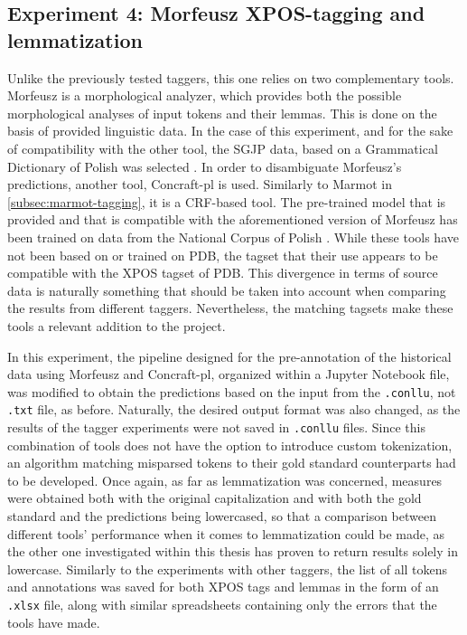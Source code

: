 \subsection{Experiment 4: Morfeusz XPOS-tagging and lemmatization}
\label{subsec:morfeusz-tagging}

Unlike the previously tested taggers, this one relies on two complementary tools. Morfeusz is a morphological analyzer, which provides both the possible morphological analyses of input tokens and their lemmas. This is done on the basis of provided linguistic data. In the case of this experiment, and for the sake of compatibility with the other tool, the SGJP data, based on a Grammatical Dictionary of Polish was selected \citep{sal:etal:15, kie:wol:17:morf}. In order to disambiguate Morfeusz's predictions, another tool, Concraft-pl is used. Similarly to Marmot in \autoref{subsec:marmot-tagging}, it is a CRF-based tool. The pre-trained model that is provided and that is compatible with the aforementioned version of Morfeusz has been trained on data from the National Corpus of Polish \citep{nkjp, waszczuk-2012-harnessing, waszczuk2018morphosyntactic}. While these tools have not been based on or trained on PDB, the tagset that their use appears to be compatible with the XPOS tagset of PDB. This divergence in terms of source data is naturally something that should be taken into account when comparing the results from different taggers. Nevertheless, the matching tagsets make these tools a relevant addition to the project. 

In this experiment, the pipeline designed for the pre-annotation of the historical data using Morfeusz and Concraft-pl, organized within a Jupyter Notebook file, was modified to obtain the predictions based on the input from the \texttt{.conllu}, not \texttt{.txt} file, as before. Naturally, the desired output format was also changed, as the results of the tagger experiments were not saved in \texttt{.conllu} files. Since this combination of tools does not have the option to introduce custom tokenization, an algorithm matching misparsed tokens to their gold standard counterparts had to be developed. Once again, as far as lemmatization was concerned, measures were obtained both with the original capitalization and with both the gold standard and the predictions being lowercased, so that a comparison between different tools' performance when it comes to lemmatization could be made, as the other one investigated within this thesis has proven to return results solely in lowercase. Similarly to the experiments with other taggers, the list of all tokens and annotations was saved for both XPOS tags and lemmas in the form of an \texttt{.xlsx} file, along with similar spreadsheets containing only the errors that the tools have made.

